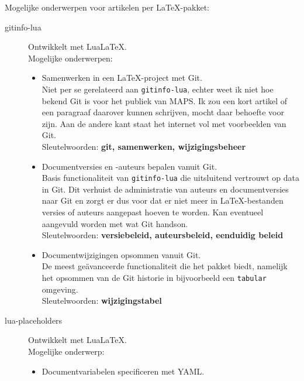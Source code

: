 \documentclass[11pt]{article}
\begin{document}
    \noindent
    Mogelijke onderwerpen voor artikelen per \LaTeX-pakket:

    \begin{description}
        \item[gitinfo-lua] Ontwikkelt met Lua\LaTeX{}.\\
        Mogelijke onderwerpen:
        \begin{itemize}
            \item Samenwerken in een \LaTeX-project met Git.\\
            {
                \footnotesize
                Niet per se gerelateerd aan \texttt{gitinfo-lua}, echter weet ik niet hoe bekend Git is voor het publiek van MAPS.
                Ik zou een kort artikel of een paragraaf daarover kunnen schrijven, mocht daar behoefte voor zijn.
                Aan de andere kant staat het internet vol met voorbeelden van Git.\\
                Sleutelwoorden: \textbf{git, samenwerken, wijzigingsbeheer}
            }
            \item Documentversies en -auteurs bepalen vanuit Git.\\
            {
                \footnotesize
                Basis functionaliteit van \texttt{gitinfo-lua} die uitsluitend vertrouwt op data in Git.
                Dit verhuist de administratie van auteurs en documentversies naar Git en zorgt er dus voor dat er niet meer in \LaTeX-bestanden versies of auteurs aangepast hoeven te worden.
                Kan eventueel aangevuld worden met wat Git handson.\\
                Sleutelwoorden: \textbf{versiebeleid, auteursbeleid, eenduidig beleid}
            }
            \item Documentwijzigingen opsommen vanuit Git.\\
            {
                \footnotesize
                De meest geävanceerde functionaliteit die het pakket biedt, namelijk het opsommen van de Git historie in bijvoorbeeld een \texttt{tabular} omgeving.\\
                Sleutelwoorden: \textbf{wijzigingstabel}
            }
        \end{itemize}
        \item[lua-placeholders] Ontwikkelt met Lua\LaTeX{}.\\
        Mogelijke onderwerp:
        \begin{itemize}
            \item Documentvariabelen specificeren met YAML.\\

\end{itemize}
\end{description}
\end{document}
